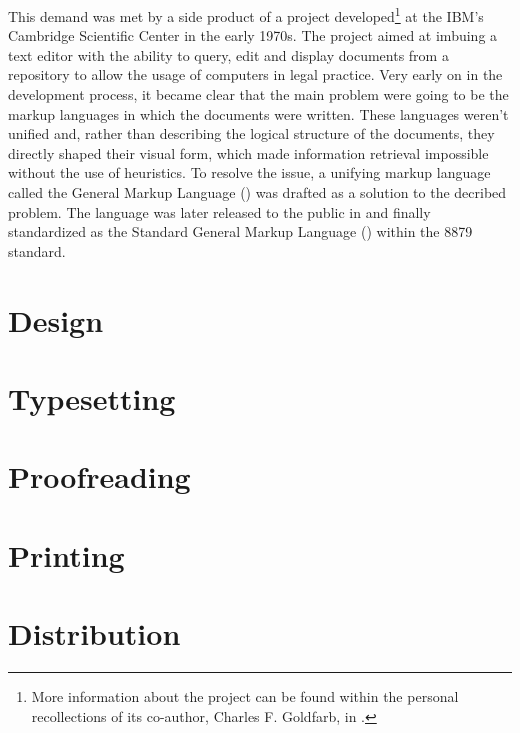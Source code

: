 \documentclass[b5paper]{book}
\begin{document}
        This demand was met by a side product of a project developed\footnote{
          More information about the project can be found within the personal
          recollections of its co-author, Charles F. Goldfarb, in
          \cite{goldfarb96,goldfarb97}.
        } at the IBM's Cambridge Scientific Center in the early 1970s. The
        project aimed at imbuing a text editor with the ability to query, edit
        and display documents from a repository to allow the usage of computers
        in legal practice. Very early on in the development process, it became
        clear that the main problem were going to be the markup languages in
        which the documents were written. These languages weren't unified and,
        rather than describing the logical structure of the documents, they
        directly shaped their visual form, which made information retrieval
        impossible without the use of heuristics. To resolve the issue, a
        unifying markup language called the General Markup Language
        () was drafted as a solution to the decribed problem. The
        language was later released to the public in \cite{goldfarb81} and
        finally standardized as the Standard General Markup Language
        () within the  8879 standard.


    \chapter{Design}
    \chapter{Typesetting}
    \chapter{Proofreading}
    \chapter{Printing}
    \chapter{Distribution}
\end{document}
